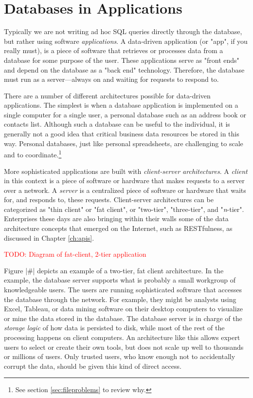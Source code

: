 \documentclass[11pt]{book}
\newcommand{\term}[1]{\emph{#1}} %
\newcommand{\todo}[1]{\textcolor{red}{TODO: #1}} %
\begin{document}
\section{Databases in Applications}

Typically we are not writing ad hoc SQL queries directly through the database, but rather using software \term{applications}.  A data-driven application (or "app", if you really must), is a piece of software that retrieves or processes data from a database for some purpose of the user.  These applications serve as "front ends" and depend on the database as a "back end" technology.  Therefore, the database must run as a server---always on and waiting for requests to respond to.

There are a number of different architectures possible for data-driven applications.  The simplest is when a database application is implemented on a single computer for a single user, a personal database such as an address book or contacts list.  Although such a database can be useful to the individual, it is generally not a good idea that critical business data resources be stored in this way.  Personal databases, just like personal spreadsheets, are challenging to scale and to coordinate.\footnote{See section \ref{sec:fileproblems} to review why.} 

More sophisticated applications are built with \term{client-server architectures}.  A \term{client} in this context is a piece of software or hardware that makes requests to a server over a network.  A \term{server} is a centralized piece of software or hardware that waits for, and responds to, these requests.  Client-server architectures can be categorized as "thin client" or "fat client", or "two-tier", "three-tier", and "\emph{n}-tier".  Enterprises these days are also bringing within their walls some of the data architecture concepts that emerged on the Internet, such as RESTfulness, as discussed in Chapter \ref{ch:apis}.

\todo{Diagram of fat-client, 2-tier application}

Figure |#| depicts an example of a two-tier, fat client architecture.  In the example, the database server supports what is probably a small workgroup of knowledgeable users.  The users are running sophisticated software that accesses the database through the network.  For example, they might be analysts using Excel, Tableau, or data mining software on their desktop computers to visualize or mine the data stored in the database.  The database server is in charge of the \term{storage logic} of how data is persisted to disk, while most of the rest of the processing happens on client computers.  An architecture like this allows expert users to select or create their own tools, but does not scale up well to thousands or millions of users.  Only trusted users, who know enough not to accidentally corrupt the data, should be given this kind of direct access.
\end{document}
